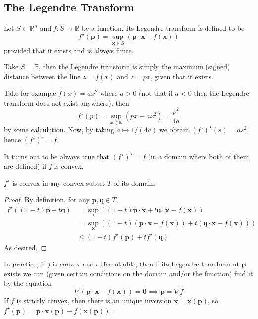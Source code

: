 \documentclass{article}
\begin{document}
\subsection{The Legendre Transform}
\begin{definition}
    Let $S\subset\mathbb R^n$ and $f:S\to\mathbb R$ be a function.
    Its Legendre transform is defined to be
    $$f^\star(\mathbf{p})=\sup_{\mathbf{x}\in S}(\mathbf{p}\cdot\mathbf{x}-f(\mathbf{x}))$$
    provided that it exists and is always finite.
\end{definition}
\begin{example}
    Take $S=\mathbb R$, then the Legendre transform is simply the maximum (signed) distance between the line $z=f(x)$ and $z=px$, given that it exists.

    Take for example $f(x)=ax^2$ where $a>0$ (not that if $a<0$ then the Legendre transform does not exist anywhere), then
    $$f^\star(p)=\sup_{x\in\mathbb R}(px-ax^2)=\frac{p^2}{4a}$$
    by some calculation.
    Now, by taking $a\mapsto 1/(4a)$ we obtain $(f^\star)^\star(s)=as^2$, hence $(f^\star)^\star=f$.
\end{example}
It turns out to be always true that $(f^\star)^\star=f$ (in a domain where both of them are defined) if $f$ is convex.
\begin{proposition}
    $f^\star$ is convex in any convex subset $T$ of its domain.
\end{proposition}
\begin{proof}
    By definition, for any $\mathbf{p},\mathbf{q}\in T$,
    \begin{align*}
        f^\star((1-t)\mathbf{p}+t\mathbf{q})&=\sup_{\mathbf{x}}((1-t)\mathbf{p}\cdot\mathbf{x}+t\mathbf{q}\cdot\mathbf{x}-f(\mathbf{x}))\\
        &=\sup_{\mathbf{x}}((1-t)(\mathbf{p}\cdot\mathbf{x}-f(\mathbf{x}))+t(\mathbf{q}\cdot\mathbf{x}-f(\mathbf{x})))\\
        &\le (1-t)f^{\star}(\mathbf{p})+tf^\star(\mathbf{q})
    \end{align*}
    As desired.
\end{proof}
In practice, if $f$ is convex and differentiable, then if its Legendre transform at $\mathbf{p}$ exists we can (given certain conditions on the domain and/or the function) find it by the equation
$$\nabla(\mathbf{p}\cdot\mathbf{x}-f(\mathbf{x}))=\mathbf{0}\implies \mathbf{p}=\nabla f$$
If $f$ is strictly convex, then there is an unique inversion $\mathbf{x}=\mathbf{x}(\mathbf{p})$, so $f^\star(\mathbf{p})=\mathbf{p}\cdot\mathbf{x}(\mathbf{p})-f(\mathbf{x}(\mathbf{p}))$.
\newpage
\end{document}
